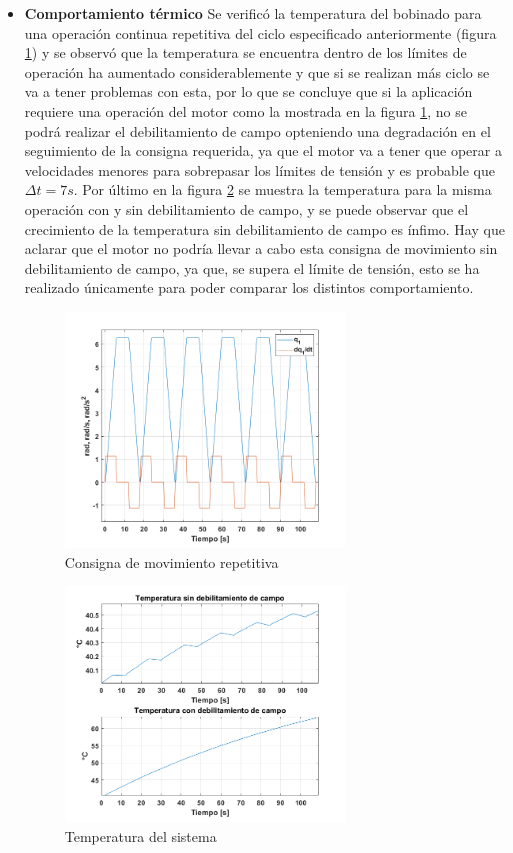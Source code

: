 \documentclass[10pt]{article}
\begin{document}
\begin{itemize}
\item \textbf{Comportamiento térmico}
Se verificó la temperatura del bobinado para una operación continua repetitiva del ciclo especificado anteriormente (figura \ref{fig:rep}) y se observó que
la temperatura se encuentra dentro de los límites de operación ha aumentado considerablemente y que si se realizan más ciclo se va a tener problemas con esta, por lo que
se concluye que si la aplicación requiere una operación del motor como la mostrada en la figura \ref{fig:rep}, no se podrá realizar el debilitamiento de campo
 opteniendo una degradación en el seguimiento de la consigna requerida, ya que el motor va a tener que operar a velocidades menores para sobrepasar los límites de tensión y es probable que 
 $\Delta t=7 s$. Por último en la figura \ref{fig:temp} se muestra la temperatura para la misma operación con y sin debilitamiento de campo, y se puede observar que el crecimiento de la temperatura
 sin debilitamiento de campo es ínfimo. Hay que aclarar que el motor no podría llevar a cabo esta consigna de movimiento sin debilitamiento de campo, ya que, se supera el límite de tensión,
  esto se ha realizado únicamente para poder comparar los distintos comportamiento.
  \begin{figure}[h!]
	\centering
	\includegraphics[width=0.7\textwidth]{rep.png}
	\caption{\label{fig:rep}Consigna de movimiento repetitiva}
	\end{figure}
	\begin{figure}[h!]
		\centering
		\includegraphics[width=0.7\textwidth]{temp.png}
		\caption{\label{fig:temp}Temperatura del sistema}
		\end{figure}


\end{itemize}
\end{document}
